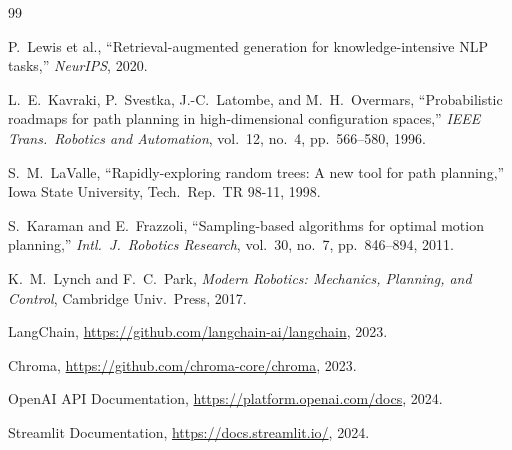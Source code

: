 \documentclass[12pt, a4paper]{article}
\begin{document}
\begin{thebibliography}{99}

P.~Lewis et al., ``Retrieval-augmented generation for knowledge-intensive NLP tasks,'' \textit{NeurIPS}, 2020.

L.~E.~Kavraki, P.~Svestka, J.-C.~Latombe, and M.~H.~Overmars, ``Probabilistic roadmaps for path planning in high-dimensional configuration spaces,'' \textit{IEEE Trans.\ Robotics and Automation}, vol.~12, no.~4, pp.~566--580, 1996.

S.~M.~LaValle, ``Rapidly-exploring random trees: A new tool for path planning,'' Iowa State University, Tech.\ Rep.\ TR 98-11, 1998.

S.~Karaman and E.~Frazzoli, ``Sampling-based algorithms for optimal motion planning,'' \textit{Intl.\ J.\ Robotics Research}, vol.~30, no.~7, pp.~846--894, 2011.

K.~M.~Lynch and F.~C.~Park, \textit{Modern Robotics: Mechanics, Planning, and Control}, Cambridge Univ.\ Press, 2017.

LangChain, \url{https://github.com/langchain-ai/langchain}, 2023.

Chroma, \url{https://github.com/chroma-core/chroma}, 2023.

OpenAI API Documentation, \url{https://platform.openai.com/docs}, 2024.

Streamlit Documentation, \url{https://docs.streamlit.io/}, 2024.

\end{thebibliography}
\end{document}
